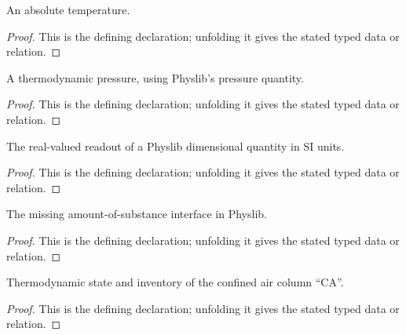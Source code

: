 \begin{definition}[AbsoluteTemperature]
  \label{decl:physics:IPhO_2026_4_A_1:AbsoluteTemperature}
  An absolute temperature.
\end{definition}
\begin{proof}
  This is the defining declaration; unfolding it gives the stated typed data or relation.
\end{proof}

\begin{definition}[Pressure]
  \label{decl:physics:IPhO_2026_4_A_1:Pressure}
  A thermodynamic pressure, using Physlib's pressure quantity.
\end{definition}
\begin{proof}
  This is the defining declaration; unfolding it gives the stated typed data or relation.
\end{proof}

\begin{definition}[siValue]
  \label{decl:physics:IPhO_2026_4_A_1:siValue}
  The real-valued readout of a Physlib dimensional quantity in SI units.
\end{definition}
\begin{proof}
  This is the defining declaration; unfolding it gives the stated typed data or relation.
\end{proof}

\begin{definition}[SubstanceCountingModel]
  \label{decl:physics:IPhO_2026_4_A_1:SubstanceCountingModel}
  The missing amount-of-substance interface in Physlib.
\end{definition}
\begin{proof}
  This is the defining declaration; unfolding it gives the stated typed data or relation.
\end{proof}

\begin{definition}[ConfinedAirState]
  \label{decl:physics:IPhO_2026_4_A_1:ConfinedAirState}
  Thermodynamic state and inventory of the confined air column “CA”.
\end{definition}
\begin{proof}
  This is the defining declaration; unfolding it gives the stated typed data or relation.
\end{proof}

